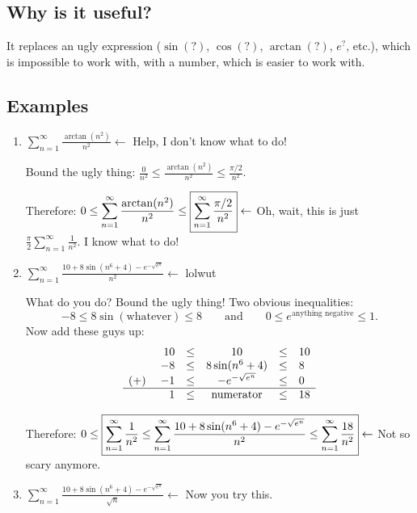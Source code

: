 \documentclass[11pt]{article}
\begin{document}
\subsection{Why is it useful?}

It replaces an ugly expression ($\sin(?)$, $\cos(?)$, $\arctan(?)$, $e^?$,
etc.), which is impossible to work with, with a number, which is easier to work
with.

\subsection{Examples}

\begin{enumerate}

  \item $\displaystyle \sum_{n=1}^\infty \frac{\arctan(n^2)}{n^2} \gets$ Help, I
  don't know what to do!

  Bound the ugly thing: $\displaystyle \frac0{n^2} \leq \frac{\arctan(n^2)}{n^2} \leq
  \frac{\pi/2}{n^2}$.

  Therefore: $
    \displaystyle 0 
    \leq 
    \sum_{n=1}^\infty \frac{\arctan(n^2)}{n^2} 
    \leq
    \fbox{$\displaystyle\sum_{n=1}^\infty\frac{\pi/2}{n^2}$} 
  \gets$ Oh, wait, this
  is just $\displaystyle \frac\pi2\sum_{n=1}^\infty\frac1{n^2}$. I know what to
  do!

  \item $\displaystyle \sum_{n=1}^\infty \frac{10+8\sin(n^6+4)-e^{-\sqrt{e^n
  }}}{n^2} \gets$ lolwut

  What do you do? Bound the ugly thing! Two obvious inequalities: \[
    -8 \leq 8\sin(\text{whatever}) \leq 8 \qquad \text{and} \qquad
    0 \leq e^{\text{anything negative}} \leq 1.
  \]
  Now add these guys up: \[
    \begin{array}{rrcccl}
             & 10 & \leq & 10               & \leq & 10 \\
             & -8 & \leq & 8\sin(n^6+4)     & \leq & 8 \\
      (+) \; & -1 & \leq & -e^{-\sqrt{e^n}} & \leq & 0 \\\hline
             &  1 & \leq & \text{numerator} & \leq & 18
    \end{array}
  \]

  Therefore: $\displaystyle 0 \leq \fbox{$
    \displaystyle \sum_{n=1}^\infty \frac{1}{n^2} 
    \leq
    \sum_{n=1}^\infty\frac{10+8\sin(n^6+4)-e^{-\sqrt{e^n}}}{n^2} 
    \leq
    \sum_{n=1}^\infty \frac{18}{n^2}
  $} \gets$ Not so scary anymore.

  \item $\displaystyle \sum_{n=1}^\infty \frac{10+8\sin(n^6+4)-e^{-\sqrt{e^n
  }}}{\sqrt n} \gets$ Now you try this.

\end{enumerate}
\end{document}
